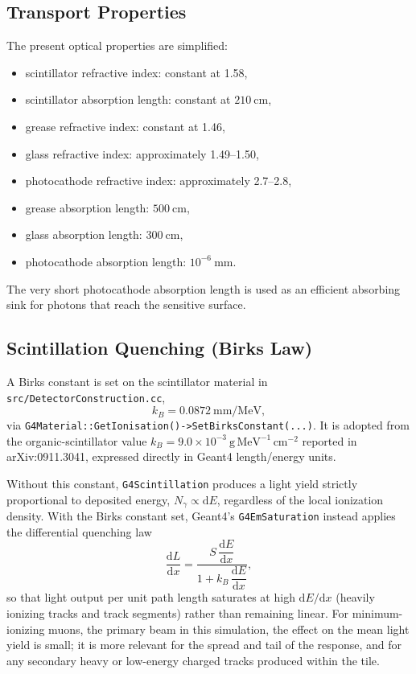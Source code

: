 \subsection{Transport Properties}
The present optical properties are simplified:
\begin{itemize}
\item scintillator refractive index: constant at 1.58,
\item scintillator absorption length: constant at $210~\mathrm{cm}$,
\item grease refractive index: constant at 1.46,
\item glass refractive index: approximately 1.49--1.50,
\item photocathode refractive index: approximately 2.7--2.8,
\item grease absorption length: $500~\mathrm{cm}$,
\item glass absorption length: $300~\mathrm{cm}$,
\item photocathode absorption length: $10^{-6}~\mathrm{mm}$.
\end{itemize}

The very short photocathode absorption length is used as an efficient absorbing sink for photons that reach the sensitive surface.

\subsection{Scintillation Quenching (Birks Law)}
\label{sec:birks-constant}
A Birks constant is set on the scintillator material in
\texttt{src/DetectorConstruction.cc},
\[
  k_B = 0.0872~\mathrm{mm/MeV},
\]
via \texttt{G4Material::GetIonisation()->SetBirksConstant(...)}. It is
adopted from the organic-scintillator value
$k_B = 9.0\times10^{-3}~\mathrm{g\,MeV^{-1}\,cm^{-2}}$ reported in
arXiv:0911.3041, expressed directly in Geant4 length/energy units.

Without this constant, \texttt{G4Scintillation} produces a light yield
strictly proportional to deposited energy, $N_\gamma \propto \mathrm{d}E$,
regardless of the local ionization density. With the Birks constant set,
Geant4's \texttt{G4EmSaturation} instead applies the differential quenching
law
\[
  \frac{\mathrm{d}L}{\mathrm{d}x} =
  \frac{S\,\dfrac{\mathrm{d}E}{\mathrm{d}x}}
       {1 + k_B\,\dfrac{\mathrm{d}E}{\mathrm{d}x}},
\]
so that light output per unit path length saturates at high $\mathrm{d}E/\mathrm{d}x$
(heavily ionizing tracks and track segments) rather than remaining linear.
For minimum-ionizing muons, the primary beam in this simulation, the effect
on the mean light yield is small; it is more relevant for the spread and
tail of the response, and for any secondary heavy or low-energy charged
tracks produced within the tile.

